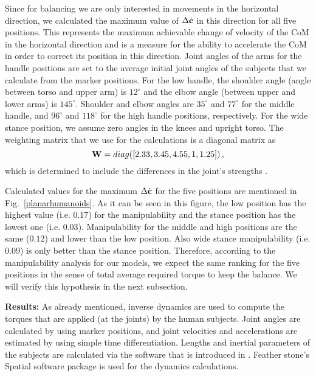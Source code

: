 Since for balancing we are only interested in movements in the horizontal direction, we calculated the maximum value of $\Delta \dot{\mathbf{c}}$ in this direction for all five positions. This represents the maximum achievable change of velocity of the CoM in the horizontal direction and is a measure for the ability to accelerate the CoM in order to correct its position in this direction. Joint angles of the arms for the handle positions are set to the average initial joint angles of the subjects that we calculate from the marker positions. For the low handle, the shoulder angle (angle between torso and upper arm) is $12^\circ$ and the elbow angle (between upper and lower arms) is $145^\circ$. Shoulder and elbow angles are $35^\circ$ and $77^\circ$ for the middle handle, and $96^\circ$ and $118^\circ$ for the high handle positions, respectively. For the wide stance position, we assume zero angles in the knees and upright torso. The weighting matrix that we use for the calculations is a diagonal matrix as
%
\begin{equation}
\mathbf{W} = diag([2.33, 3.45, 4.55, 1, 1.25]) \, ,
\end{equation}
%
which is determined to include the differences in the joint's strengths \cite{Anderson2007, Bober2002, Gandevia1998, Moraux2013}.

Calculated values for the maximum $\Delta \dot{\mathbf{c}}$ for the five positions are mentioned in Fig.~\ref{planarhumanoids}. As it can be seen in this figure, the low position has the highest value (i.e. $0.17$) for the manipulability and the stance position has the lowest one (i.e. $0.03$). Manipulability for the middle and high positions are the same ($0.12$) and lower than the low position. Also wide stance manipulability (i.e. $0.09$) is only better than the stance position. Therefore, according to the manipulability analysis for our models, we expect the same ranking for the five positions in the sense of total average required torque to keep the balance. We will verify this hypothesis in the next subsection.


\textbf{Results:} As already mentioned, inverse dynamics are used to compute the torques that are applied (at the joints) by the human subjects. Joint angles are calculated by using marker positions, and joint velocities and accelerations are estimated by using simple time differentiation. Lengths and inertial parameters of the subjects are calculated via the software that is introduced in \cite{Zlajpah&Babic14}. Feather stone's Spatial software package \cite{Featherstone} is used for the dynamics calculations.


